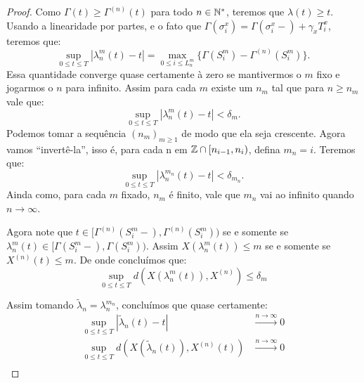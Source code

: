 \begin{proof}
  Como $\Gamma(t) \geq \Gamma^{(n)}(t)$ para todo $n \in {\mathbb{N^*}}$, teremos
  que $\lambda(t) \geq t$. Usando a linearidade por partes, e o fato
  que $\Gamma(\sigma^x_i) = \Gamma(\sigma_i^x-) + \gamma_x T^x_i$,
  teremos que:
  \begin{displaymath}
    \sup_{0 \leq t \leq T} |\lambda_n^m(t) - t| =
    \max_{0 \leq i \leq L_n^m} \{ \Gamma(S_i^m) -
    \Gamma^{(n)}(S_i^m)\}.
  \end{displaymath}
  Essa quantidade converge quase certamente à zero se mantivermos o
  $m$ fixo e jogarmos o $n$ para infinito. Assim para cada $m$ existe
  um $n_m$ tal que para $n \geq n_m$ vale que:
  \begin{displaymath}
    \sup_{0 \leq t \leq T} |\lambda_n^m(t) - t| < \delta_m.
  \end{displaymath}
  Podemos tomar a sequência $(n_m)_{m \geq 1}$ de modo que ela seja
  crescente. Agora vamos ``invertê-la'', isso é, para cada n em ${\mathbb{Z}}
  \cap [n_{i-1}, n_i)$, defina $m_n = i$. Teremos que:
  \begin{displaymath}
    \sup_{0 \leq t \leq T} |\lambda_n^{m_n}(t) - t| < \delta_{m_n}.
  \end{displaymath}
  Ainda como, para cada $m$ fixado, $n_m$ é finito, vale que $m_n$ vai
  ao infinito quando $n \to \infty$.
  
  Agora note que $t \in [\Gamma^{(n)}(S_{i}^m-),
  \Gamma^{(n)}(S_{i}^m))$ se e somente se $\lambda_n^m(t) \in
  [\Gamma(S_{i}^m-), \Gamma(S_{i}^m))$. Assim $X(\lambda_n^m(t)) \leq
  m$ se e somente se $X^{(n)}(t) \leq m$. De onde concluímos que:
  \begin{displaymath}
    \sup_{0 \leq t \leq T} d\left(X(\lambda_n^m(t)), X^{(n)}\right)
    \leq \delta_m
  \end{displaymath}

  Assim tomando $\tilde{\lambda}_n = \lambda_n^{m_n}$, concluímos que
  quase certamente:
  \begin{align*}
    \sup_{0 \leq t \leq T} |\tilde{\lambda}_n(t) - t|
    &\xrightarrow{n\to\infty} 0 \\
    \sup_{0 \leq t \leq T} d(X(\tilde{\lambda}_n(t)), X^{(n)}(t))
    &\xrightarrow{n\to\infty} 0 \\
  \end{align*}
\end{proof}

